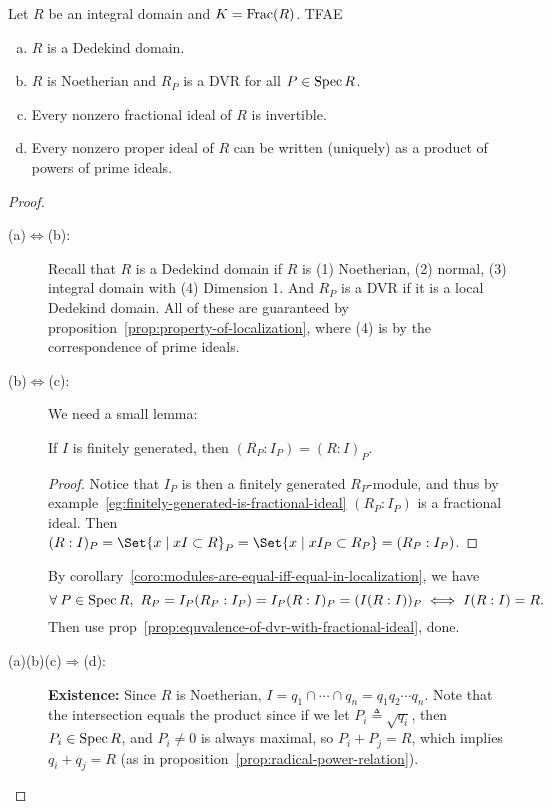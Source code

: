 \begin{theorem}
  Let $R$ be an integral domain and $K= \operatorname{Frac}(R)$. TFAE
  \begin{enumerate}[(a)]
    \item $R$ is a Dedekind domain.
    \item $R$ is Noetherian and $R_P$ is a DVR for all $P \in \operatorname{Spec} R$.
    \item Every nonzero fractional ideal of $R$ is invertible.
    \item Every nonzero proper ideal of $R$ can be written (uniquely) as a
      product of powers of prime ideals.
  \end{enumerate}

  \begin{proof} \mbox{}
    \begin{description}
      \item[\rm (a)$\Leftrightarrow$(b):]
        Recall that $R$ is a Dedekind domain if $R$ is (1) Noetherian,
        (2) normal, (3) integral domain with (4) Dimension 1.
        And $R_P$ is a DVR if it is a local Dedekind domain.
        All of these are guaranteed by proposition~\ref{prop:property-of-localization},
        where (4) is by the correspondence of prime ideals.
      \item[\rm (b)$\Leftrightarrow$(c):] We need a small lemma:
        \begin{lemma}
          If $I$ is finitely generated, then $(R_P : I_P) = (R: I)_P$.
          \begin{proof}
            Notice that $I_P$ is then a finitely generated $R_P$-module,
            and thus by example~\ref{eg:finitely-generated-is-fractional-ideal}
            $(R_P: I_P)$ is a fractional ideal.
            Then $(R: I)_P = \Set{ x \mid xI \subset R}_P
            = \Set{x \mid x I_P \subset R_P} = (R_P: I_P)$.
          \end{proof}
        \end{lemma}
        By corollary~\ref{coro:modules-are-equal-iff-equal-in-localization},
        we have
        \[
          \forall P \in \Spec R, \ R_P = I_P(R_P : I_P)
          = I_P (R: I)_P = (I (R:I))_P \iff I (R:I) = R.
        \]
        Then use prop~\ref{prop:equvalence-of-dvr-with-fractional-ideal},
        done.

      \item[\rm (a)(b)(c)$\Rightarrow$(d):] $ $ \\
        {\bf Existence:} Since $R$ is Noetherian,
        $I = q_1 \cap \cdots \cap q_n = q_1 q_2 \dotsm q_n$.
        Note that the intersection equals the product since
        if we let $P_i \triangleq \sqrt{q_i}$, then $P_i \in \operatorname{Spec} R$,
        and $P_i \ne 0$ is always maximal, so $P_i + P_j = R$,
        which implies $q_i + q_j = R$ (as in proposition~\ref{prop:radical-power-relation}).


\end{description}
\end{proof}
\end{theorem}
